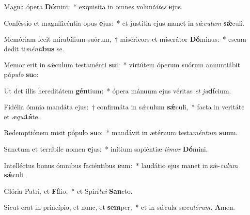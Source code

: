 \item Magna ópera \textbf{Dó}mini:~* exquisíta in omnes volun\hspace{0.03em}\textit{tátes} \textbf{e}jus.
\item Conféssio et magnificéntia opus \textbf{e}jus:~* et justítia ejus manet in sǽ\hspace{0.03em}\textit{culum} \textbf{sǽ}culi.
\item Memóriam fecit mirabílium suórum,~† miséricors et miserátor \textbf{Dó}minus:~* escam dedit ti\textit{ménti}\textbf{bus} se.
\item Memor erit in sǽculum testaménti \textbf{su}i:~* virtútem óperum suórum annuntiábit pó\textit{pulo} \textbf{su}o:
\item Ut det illis hereditátem \textbf{gén}tium:~* ópera mánuum ejus véritas \textit{et} \textit{ju}\textbf{dí}cium.
\item Fidélia ómnia mandáta ejus:~† confirmáta in sǽculum \textbf{sǽ}culi,~* facta in veritáte et \textit{æqui}\textbf{tá}te.
\item Redemptiónem misit pópulo \textbf{su}o:~* mandávit in ætérnum testa\hspace{0.03em}\textit{méntum} \textbf{su}um.
\item Sanctum et terríbile nomen \textbf{e}jus:~* inítium sapiéntiæ \textit{timor} \textbf{Dó}mini.
\item Intelléctus bonus ómnibus faciéntibus \textbf{e}um:~* laudátio ejus manet in sǽ-\hspace{0.03em}\textit{culum} \textbf{sǽ}culi.
\item Glória Patri, et \textbf{Fí}lio,~* et Spirí\hspace{0.03em}\textit{tui} \textbf{San}cto.
\item Sicut erat in princípio, et nunc, et \textbf{sem}per,~* et in sǽcula sæcu\hspace{0.03em}\textit{lórum.} \textbf{A}men.